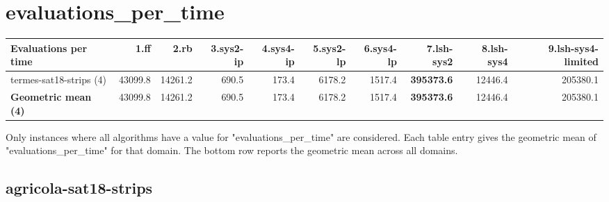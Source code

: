 \documentclass{article}
\newcommand{\numtasks}[1]{\small{(#1)}}
\begin{document}
\hypertarget{evaluations_per_time}{}
\section*{evaluations\_per\_time}

\begin{tabular}{@{}lrrrrrrrrr@{}}
Evaluations per time & 1.ff & 2.rb & 3.sys2-ip & 4.sys4-ip & 5.sys2-lp & 6.sys4-lp & 7.lsh-sys2 & 8.lsh-sys4 & 9.lsh-sys4-limited \\
\midrule
termes-sat18-strips \numtasks{4} & 43099.8 & 14261.2 & 690.5 & 173.4 & 6178.2 & 1517.4 & \textbf{395373.6} & 12446.4 & 205380.1 \\
\textbf{Geometric mean \numtasks{4}} & 43099.8 & 14261.2 & 690.5 & 173.4 & 6178.2 & 1517.4 & \textbf{395373.6} & 12446.4 & 205380.1 \\
\end{tabular}

Only instances where all algorithms have a value for "evaluations\_per\_time" are considered. Each table entry gives the geometric mean of "evaluations\_per\_time" for that domain. The bottom row reports the geometric mean across all domains.

\hypertarget{evaluations_per_time-agricola-sat18-strips}{}
\subsection*{agricola-sat18-strips}
\end{document}
